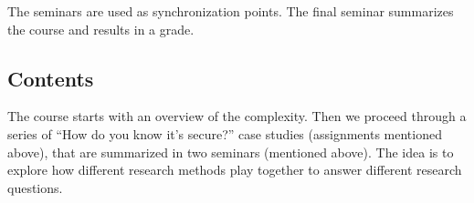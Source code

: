 The seminars are used as synchronization points.
The final seminar summarizes the course and results in a grade.


\subsection{Contents}

The course starts with an overview of the complexity.
Then we proceed through a series of \enquote{How do you know it's secure?} case 
studies (assignments mentioned above), that are summarized in two seminars 
(mentioned above).
The idea is to explore how different research methods play together to answer 
different research questions.

